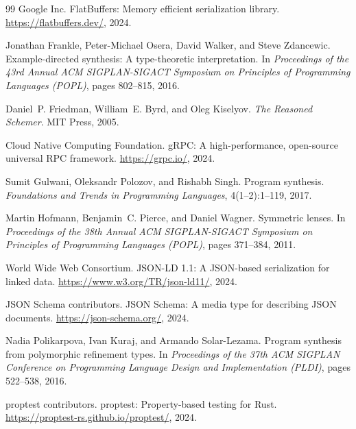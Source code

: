 \documentclass[11pt,a4paper]{article}
\theoremstyle{definition}
\theoremstyle{remark}
\begin{document}
\begin{thebibliography}{99}
Google Inc.
\newblock FlatBuffers: Memory efficient serialization library.
\newblock \url{https://flatbuffers.dev/}, 2024.

Jonathan Frankle, Peter-Michael Osera, David Walker, and Steve Zdancewic.
\newblock Example-directed synthesis: A type-theoretic interpretation.
\newblock In \emph{Proceedings of the 43rd Annual ACM SIGPLAN-SIGACT
  Symposium on Principles of Programming Languages (POPL)}, pages 802--815,
  2016.

Daniel~P. Friedman, William~E. Byrd, and Oleg Kiselyov.
\newblock \emph{The Reasoned Schemer}.
\newblock MIT Press, 2005.

Cloud Native Computing Foundation.
\newblock gRPC: A high-performance, open-source universal RPC framework.
\newblock \url{https://grpc.io/}, 2024.

Sumit Gulwani, Oleksandr Polozov, and Rishabh Singh.
\newblock Program synthesis.
\newblock \emph{Foundations and Trends in Programming Languages},
  4(1--2):1--119, 2017.

Martin Hofmann, Benjamin~C. Pierce, and Daniel Wagner.
\newblock Symmetric lenses.
\newblock In \emph{Proceedings of the 38th Annual ACM SIGPLAN-SIGACT
  Symposium on Principles of Programming Languages (POPL)}, pages 371--384,
  2011.

World Wide Web Consortium.
\newblock JSON-LD 1.1: A JSON-based serialization for linked data.
\newblock \url{https://www.w3.org/TR/json-ld11/}, 2024.

JSON Schema contributors.
\newblock JSON Schema: A media type for describing JSON documents.
\newblock \url{https://json-schema.org/}, 2024.

Nadia Polikarpova, Ivan Kuraj, and Armando Solar-Lezama.
\newblock Program synthesis from polymorphic refinement types.
\newblock In \emph{Proceedings of the 37th ACM SIGPLAN Conference on
  Programming Language Design and Implementation (PLDI)}, pages 522--538,
  2016.

proptest contributors.
\newblock proptest: Property-based testing for Rust.
\newblock \url{https://proptest-rs.github.io/proptest/}, 2024.


\end{thebibliography}
\end{document}
